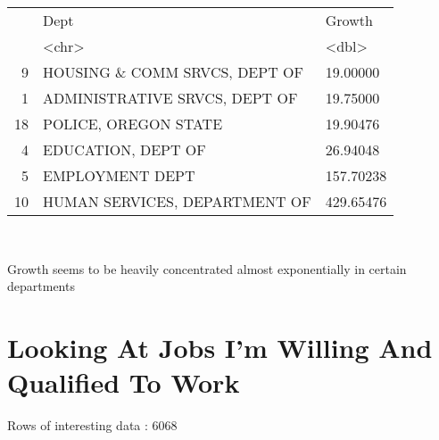 \documentclass[letterpaper]{article}
\theoremstyle{definition}
\begin{document}
    

\begin{tabular}{r|ll}
  & Dept & Growth\\
  & <chr> & <dbl>\\
\hline
	9 & HOUSING \& COMM SRVCS, DEPT OF &  19.00000\\
	1 & ADMINISTRATIVE SRVCS, DEPT OF &  19.75000\\
	18 & POLICE, OREGON STATE          &  19.90476\\
	4 & EDUCATION, DEPT OF            &  26.94048\\
	5 & EMPLOYMENT DEPT               & 157.70238\\
	10 & HUMAN SERVICES, DEPARTMENT OF & 429.65476\\
\end{tabular}


    
    

    \begin{center}
    \end{center}
    { \hspace*{\fill} \\}
    
    Growth seems to be heavily concentrated almost exponentially in certain
departments

\hypertarget{looking-at-jobs-im-willing-and-qualified-to-work}{%
\section{Looking At Jobs I'm Willing And Qualified To
Work}\label{looking-at-jobs-im-willing-and-qualified-to-work}}

    

    

Rows of interesting data : 6068
\end{document}
